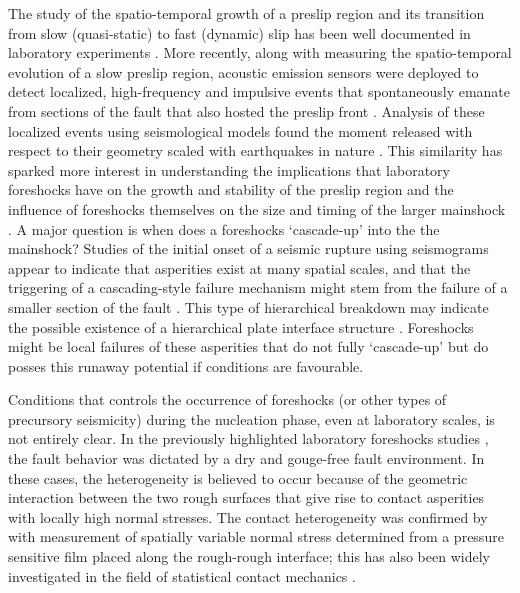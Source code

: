 \documentclass[preprint,1p, 10pt,authoryear]{elsarticle}
\begin{document}
The study of the spatio-temporal growth of a preslip region  and its transition from slow (quasi-static) to fast (dynamic) slip has been well documented in laboratory experiments \citep{Dieterich1978,Okubo1984, Ohnaka1999, Nielsen2010, Latour2013, Fukuyama2018, Zhuo2018, Ke2018, Buijze2020}. More recently, along with measuring the spatio-temporal evolution of a slow preslip region, acoustic emission sensors were deployed to detect localized, high-frequency and impulsive events that spontaneously emanate from sections of the fault that also hosted the preslip front \citep{Ma2002, McLaskey2013, Selvadurai2015, Zhuo2018a}.  Analysis of these localized events using seismological models found the moment released with respect to their geometry scaled with earthquakes in nature \citep{McLaskey2014, Selvadurai2019}. This similarity has sparked more interest in understanding the implications that laboratory foreshocks have on the growth and stability of the preslip region and the influence of foreshocks themselves on the size and timing of the larger mainshock \citep{McLaskey2019}.  A major question is when does a foreshocks `cascade-up' into the the mainshock? Studies of the initial onset of a seismic rupture using seismograms appear to indicate that asperities exist at many spatial scales, and that the triggering of a cascading-style failure mechanism might stem from the failure of a smaller section of the fault \citep{Okuda2018, Ide2019}. This type of hierarchical breakdown may indicate the possible existence of a hierarchical plate interface structure \citep{Ide2005, Aochi2014, Aochi2017}.  Foreshocks might be local failures of these asperities that do not fully `cascade-up' but do posses this runaway potential if conditions are favourable. 

Conditions that controls the occurrence of foreshocks (or other types of precursory seismicity) during the nucleation phase, even at laboratory scales, is not entirely clear. In the previously highlighted laboratory foreshocks studies \citep{McLaskey2013, Selvadurai2015}, the fault behavior was dictated by a dry and gouge-free fault environment.  In these cases, the heterogeneity is believed to occur because of the geometric interaction between the two rough surfaces that give rise to contact asperities with locally high normal stresses.  The contact heterogeneity was confirmed by \citet{Selvadurai2017} with measurement of spatially variable normal stress determined from a pressure sensitive film placed along the rough-rough interface; this has also been widely investigated in the field of statistical contact mechanics \citep[e.g.][]{Greenwood1966,Johnson1985, Persson2006}. 
\end{document}
